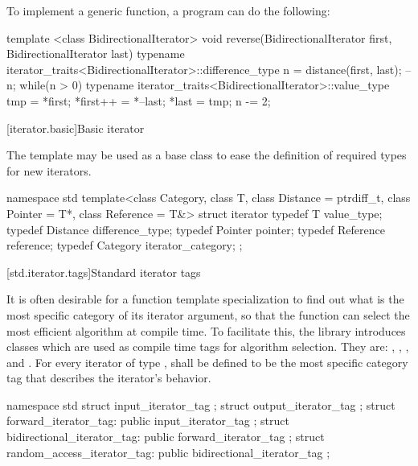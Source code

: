 \pnum
\enterexample
To implement a generic
function, a \Cpp program can do the following:

\begin{codeblock}
template <class BidirectionalIterator>
void reverse(BidirectionalIterator first, BidirectionalIterator last) {
  typename iterator_traits<BidirectionalIterator>::difference_type n =
    distance(first, last);
  --n;
  while(n > 0) {
    typename iterator_traits<BidirectionalIterator>::value_type
     tmp = *first;
    *first++ = *--last;
    *last = tmp;
    n -= 2;
  }
}
\end{codeblock}
\exitexample

[iterator.basic]{Basic iterator}

\pnum
The
template may be used as a base class to ease the definition of required types
for new iterators.

\begin{codeblock}
namespace std {
  template<class Category, class T, class Distance = ptrdiff_t,
    class Pointer = T*, class Reference = T&>
  struct iterator {
    typedef T         value_type;
    typedef Distance  difference_type;
    typedef Pointer   pointer;
    typedef Reference reference;
    typedef Category  iterator_category;
  };
}
\end{codeblock}

[std.iterator.tags]{Standard iterator tags}

\pnum
{}%
%
%
%
%
It is often desirable for a
function template specialization
to find out what is the most specific category of its iterator
argument, so that the function can select the most efficient algorithm at compile time.
To facilitate this, the
library introduces
classes which are used as compile time tags for algorithm selection.
They are:
,
,
,
and
.
For every iterator of type
,
shall be defined to be the most specific category tag that describes the
iterator's behavior.

\begin{codeblock}
namespace std {
  struct input_iterator_tag { };
  struct output_iterator_tag { };
  struct forward_iterator_tag: public input_iterator_tag { };
  struct bidirectional_iterator_tag: public forward_iterator_tag { };
  struct random_access_iterator_tag: public bidirectional_iterator_tag { };
}
\end{codeblock}

